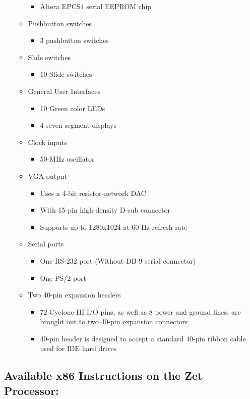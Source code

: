 \documentclass[pdftex,10.5pt]{report}
\begin{document}
\begin{itemize}
\begin{itemize}
\begin{itemize}
		\item Altera EPCS4 serial EEPROM chip
		\end{itemize}
	\item Pushbutton switches
		\begin{itemize}
		\item 3 pushbutton switches
		\end{itemize}
	\item Slide switches
		\begin{itemize}
		\item 10 Slide switches
		\end{itemize}
	\item General User Interfaces
		\begin{itemize}
		\item 10 Green color LEDs
		\item 4 seven-segment displays
		\end{itemize}
	\item Clock inputs
		\begin{itemize}
		\item 50-MHz oscillator
		\end{itemize}
	\item VGA output
		\begin{itemize}
		\item Uses a 4-bit resistor-network DAC
		\item With 15-pin high-density D-sub connector
		\item Supports up to 1280x1024 at 60-Hz refresh rate
		\end{itemize}
	\item Serial ports
		\begin{itemize}
		\item One RS-232 port (Without DB-9 serial connector)
		\item One PS/2 port
		\end{itemize}
	\item Two 40-pin expansion headers
		\begin{itemize}
		\item 72 Cyclone III I/O pins, as well as 8 power and ground lines, are brought out to two 40-pin expansion connectors
		\item40-pin header is designed to accept a standard 40-pin ribbon cable used for IDE hard drives
		\end{itemize}
	\end{itemize}
\end{itemize}

\label{App:AppendixB}
\subsection{Available x86 Instructions on the Zet Processor:}
\end{document}

